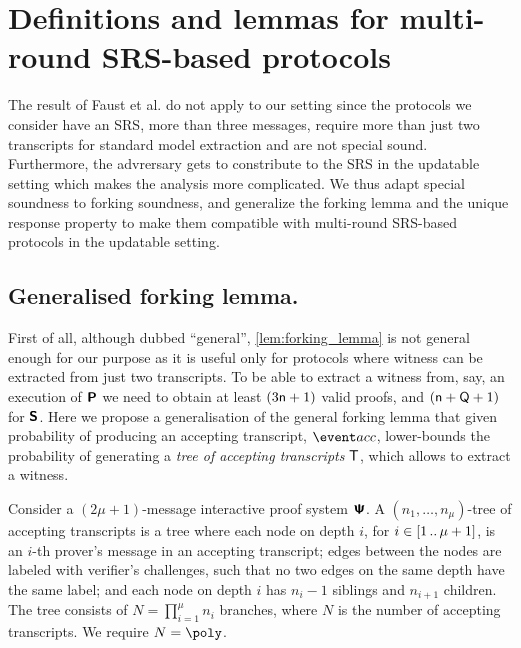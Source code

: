 \section{Definitions and lemmas for multi-round SRS-based protocols}
\label{sec:se_definitions}

The result of Faust et al.\cite{INDOCRYPT:FKMV12} do not apply to our setting
since the protocols we consider have an SRS, more than three messages, require more than
just two transcripts for standard model extraction and are not special
sound. Furthermore, the advrersary gets to constribute to the SRS in the updatable setting which makes the analysis more complicated. We thus adapt special
soundness to forking soundness, and generalize the forking lemma and the unique response property to make them compatible with
multi-round SRS-based protocols in the updatable setting.

\subsection{Generalised forking lemma.}
First of all, although dubbed ``general'', \cref{lem:forking_lemma} is not
general enough for our purpose as it is useful only for protocols where witness
can be extracted from just two transcripts. To be able to extract a witness
from, say, an execution of $\bm{\mathsf{P}}$ we need to obtain at least
$(3 \mathsf{n} + 1)$ valid proofs, and $(\mathsf{n} + \mathsf{Q} + 1)$ for $\bm{\mathsf{S}}$. Here we
propose a generalisation of the general forking lemma that given probability of
producing an accepting transcript, $\accProb$, lower-bounds the probability of
generating a \emph{tree of accepting transcripts} $\mathsf{T}$, which allows to
extract a witness.

\begin{definition}
	\label{def:tree_of_accepting_transcripts}
	Consider a $(2\mu + 1)$-message interactive proof system $\bm{\mathsf{\Psi}}$. A $(n_1,
  \ldots, n_\mu)$-tree of accepting transcripts is a tree where each node on
  depth $i$, for $i \in [1 \, .. \, \mu + 1]$, is an $i$-th prover's message in an
  accepting transcript; edges between the nodes are labeled with verifier's
  challenges, such that no two edges on the same depth have the same
  label; and each node on depth $i$ has $n_{i} - 1$ siblings and $n_{i +
    1}$ children. The tree consists of $N = \prod_{i = 1}^\mu n_i$
  branches, where $N$ is the number of accepting transcripts. We require $N = \poly$.
\end{definition}


